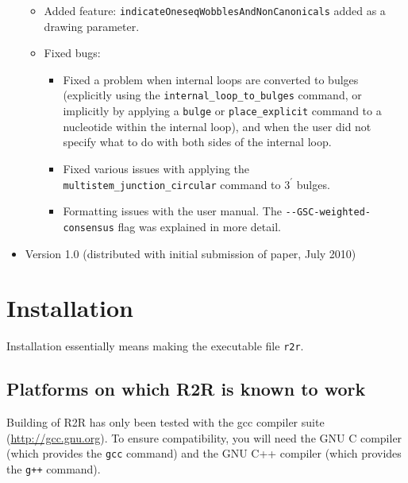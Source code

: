 \documentclass[letterpaper,12pt]{report}
\begin{document}
\begin{itemize}
\begin{itemize}
	\item Added feature: {\tt indicateOneseqWobblesAndNonCanonicals} added as a drawing parameter.
	\item Fixed bugs: 
		\begin{itemize}
		\item Fixed a problem when internal loops are converted to bulges (explicitly using the {\tt internal\_loop\_to\_bulges} command, or implicitly by applying a {\tt bulge} or {\tt place\_explicit} command to a nucleotide within the internal loop), and when the user did not specify what to do with both sides of the internal loop.  
		\item Fixed various issues with applying the {\tt multistem\_junction\_circular} command to $3^\prime$ bulges.
                \item Formatting issues with the user manual. The {\tt -{}-GSC-weighted-consensus} flag was explained in more detail.
		\end{itemize}
	\end{itemize}
\item Version 1.0 (distributed with initial submission of paper, July 2010)
\end{itemize}

\chapter{Installation}
\label{sec:install}

Installation essentially means making the executable file {\tt r2r}.%

\section{Platforms on which R2R is known to work}

Building of R2R has only been tested with the gcc compiler suite (\url{http://gcc.gnu.org}).  To ensure compatibility, you will need the GNU C compiler (which provides the {\tt gcc} command) and the GNU C++ compiler (which provides the {\tt g++} command).
\end{document}
